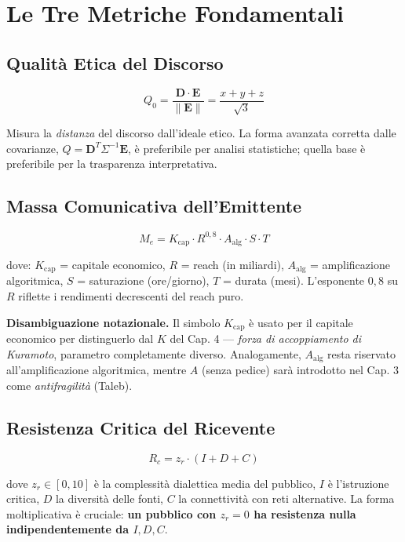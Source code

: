 \section{Le Tre Metriche
Fondamentali}\label{le-tre-metriche-fondamentali}

\subsection{Qualità Etica del
Discorso}\label{qualituxe0-etica-del-discorso}

\[
Q_0 = \frac{\mathbf{D} \cdot \mathbf{E}}{\|\mathbf{E}\|} = \frac{x + y + z}{\sqrt{3}}
\]

Misura la \emph{distanza} del discorso dall'ideale etico. La forma
avanzata corretta dalle covarianze,
\(Q = \mathbf{D}^T \Sigma^{-1} \mathbf{E}\), è preferibile per analisi
statistiche; quella base è preferibile per la trasparenza
interpretativa.

\subsection{Massa Comunicativa
dell'Emittente}\label{massa-comunicativa-dellemittente}

\[
M_e = K_{\text{cap}} \cdot R^{0{,}8} \cdot A_{\text{alg}} \cdot S \cdot T
\]

dove: \(K_{\text{cap}}\) = capitale economico, \(R\) = reach (in
miliardi), \(A_{\text{alg}}\) = amplificazione algoritmica, \(S\) =
saturazione (ore/giorno), \(T\) = durata (mesi). L'esponente \(0{,}8\)
su \(R\) riflette i rendimenti decrescenti del reach puro.

\Hypoth{} \textbf{Disambiguazione notazionale.} Il simbolo
\(K_{\text{cap}}\) è usato per il capitale economico per distinguerlo
dal \(K\) del Cap. 4 --- \emph{forza di accoppiamento di Kuramoto},
parametro completamente diverso. Analogamente, \(A_{\text{alg}}\) resta
riservato all'amplificazione algoritmica, mentre \(A\) (senza pedice)
sarà introdotto nel Cap. 3 come \emph{antifragilità} (Taleb).

\subsection{Resistenza Critica del
Ricevente}\label{resistenza-critica-del-ricevente}

\[
R_c = z_r \cdot (I + D + C)
\]

dove \(z_r \in [0, 10]\) è la complessità dialettica media del pubblico,
\(I\) è l'istruzione critica, \(D\) la diversità delle fonti, \(C\) la
connettività con reti alternative. La forma moltiplicativa è cruciale:
\textbf{un pubblico con \(z_r = 0\) ha resistenza nulla
indipendentemente da \(I, D, C\)}.



